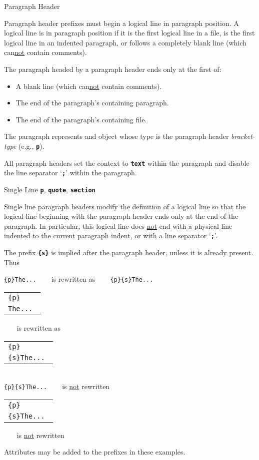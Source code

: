 \documentclass[12pt]{article}
\newcommand{\TT}[1]{{\tt \bfseries #1}}
\newenvironment{indpar}[1][0.3in]%
	{\begin{list}{}%
		     {\setlength{\itemsep}{0in}%
		      \setlength{\topsep}{0in}%
		      \setlength{\parsep}{1ex}%
		      \setlength{\labelwidth}{#1}%
		      \setlength{\leftmargin}{#1}%
		      \addtolength{\leftmargin}{\labelsep}}%
	 \item}%
	{\end{list}}
\begin{document}
\begin{indpar}[1em]
Paragraph Header
\begin{indpar}[1em]
\begin{indpar}[1em]
Paragraph header prefixes must begin a logical line in paragraph position.
A logical line is in paragraph position if it is the first logical
line in a file, is the first logical line in an indented paragraph,
or follows a completely blank line (which can\underline{not} contain
comments).

The paragraph headed by a paragraph header ends only at the first of:
\begin{itemize}
\item A blank line (which can\underline{not} contain comments).
\item The end of the paragraph's containing paragraph.
\item The end of the paragraph's containing file.
\end{itemize}

The paragraph represents and object
whose type is the paragraph header
{\em bracket-type} (e.g., \TT{p}).

All paragraph headers set the context to \TT{text} within the paragraph
and disable the line separator `\TT{;}' within the paragraph.
\end{indpar}

Single Line \hfill \TT{p}, \TT{quote}, \TT{section}
\begin{indpar}[1em]
Single line paragraph headers modify the definition of a logical
line so that the logical line beginning with the paragraph header
ends only at the end of the paragraph.
In particular, this logical line does \underline{not}
end with a physical line indented to the current paragraph indent,
or with a line separator `\TT{;}'.

The prefix \TT{\{s\}} is implied after the paragraph header,
unless it is already present.  Thus
\begin{center}
{\tt \{p\}The...} ~~~ is rewritten as ~~~ {\tt \{p\}\{s\}The...}
\\[2ex]
\begin{tabular}{l}
\tt \{p\} \\
\tt The... \\
\end{tabular}
~~~ is rewritten as ~~~
\begin{tabular}{l}
\tt \{p\} \\
\tt \{s\}The... \\
\end{tabular}
\\[2ex]
{\tt \{p\}\{s\}The...} ~~~ is \underline{not} rewritten
\\[2ex]
\begin{tabular}{l}
\tt \{p\} \\
\tt \{s\}The... \\
\end{tabular} ~~~ is \underline{not} rewritten
\end{center}
Attributes may be added to the prefixes in these examples.
\end{indpar}


\end{indpar}
\end{indpar}
\end{document}
